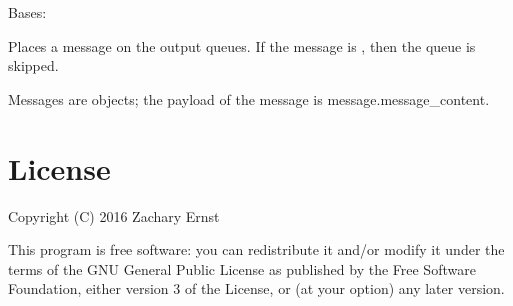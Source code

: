 \documentclass[letterpaper,10pt,english]{sphinxmanual}
\begin{document}
\begin{fulllineitems}
\label{\detokenize{api:nanostream.node_queue.queue.NanoStreamQueue}}
Bases: 

\begin{fulllineitems}
\label{\detokenize{api:nanostream.node_queue.queue.NanoStreamQueue.empty}}
\end{fulllineitems}


\begin{fulllineitems}
\label{\detokenize{api:nanostream.node_queue.queue.NanoStreamQueue.get}}
\end{fulllineitems}


\begin{fulllineitems}
\label{\detokenize{api:nanostream.node_queue.queue.NanoStreamQueue.put}}
Places a message on the output queues. If the message is ,
then the queue is skipped.

Messages are  objects; the payload of the
message is message.message\_content.

\end{fulllineitems}


\end{fulllineitems}



\chapter{License}
\label{\detokenize{license:license}}\label{\detokenize{license::doc}}
Copyright (C) 2016 Zachary Ernst

This program is free software: you can redistribute it and/or modify
it under the terms of the GNU General Public License as published by
the Free Software Foundation, either version 3 of the License, or
(at your option) any later version.
\end{document}
